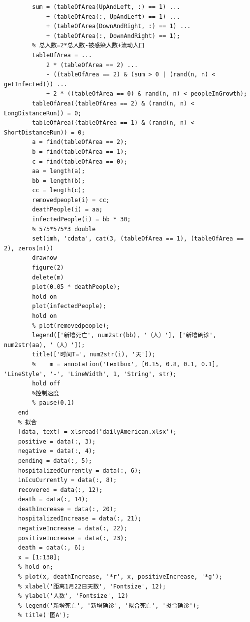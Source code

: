 \documentclass[UTF8]{ctexart}
\begin{document}
\begin{lstlisting}
        sum = (tableOfArea(UpAndLeft, :) == 1) ...
            + (tableOfArea(:, UpAndLeft) == 1) ...
            + (tableOfArea(DownAndRight, :) == 1) ...
            + (tableOfArea(:, DownAndRight) == 1);
        % 总人数=2*总人数-被感染人数+流动人口
        tableOfArea = ...
            2 * (tableOfArea == 2) ...
            - ((tableOfArea == 2) & (sum > 0 | (rand(n, n) < getInfected))) ...
            + 2 * ((tableOfArea == 0) & rand(n, n) < peopleInGrowth);
        tableOfArea((tableOfArea == 2) & (rand(n, n) < LongDistanceRun)) = 0;
        tableOfArea((tableOfArea == 1) & (rand(n, n) < ShortDistanceRun)) = 0;
        a = find(tableOfArea == 2);
        b = find(tableOfArea == 1);
        c = find(tableOfArea == 0);
        aa = length(a);
        bb = length(b);
        cc = length(c);
        removedpeople(i) = cc;
        deathPeople(i) = aa;
        infectedPeople(i) = bb * 30;
        % 575*575*3 double
        set(imh, 'cdata', cat(3, (tableOfArea == 1), (tableOfArea == 2), zeros(n)))
        drawnow
        figure(2)
        delete(m)
        plot(0.05 * deathPeople);
        hold on
        plot(infectedPeople);
        hold on
        % plot(removedpeople);
        legend(['新增死亡', num2str(bb), '（人）'], ['新增确诊', num2str(aa), '（人）']);
        title(['时间T=', num2str(i), '天']);
        %    m = annotation('textbox', [0.15, 0.8, 0.1, 0.1], 'LineStyle', '-', 'LineWidth', 1, 'String', str);
        hold off
        %控制速度
        % pause(0.1)
    end
    % 拟合
    [data, text] = xlsread('dailyAmerican.xlsx');
    positive = data(:, 3);
    negative = data(:, 4);
    pending = data(:, 5);
    hospitalizedCurrently = data(:, 6);
    inIcuCurrently = data(:, 8);
    recovered = data(:, 12);
    death = data(:, 14);
    deathIncrease = data(:, 20);
    hospitalizedIncrease = data(:, 21);
    negativeIncrease = data(:, 22);
    positiveIncrease = data(:, 23);
    death = data(:, 6);
    x = [1:138];
    % hold on;
    % plot(x, deathIncrease, '*r', x, positiveIncrease, '*g');
    % xlabel('距离1月22日天数', 'Fontsize', 12);
    % ylabel('人数', 'Fontsize', 12)
    % legend('新增死亡', '新增确诊', '拟合死亡', '拟合确诊');
    % title('图A');    
\end{lstlisting}
\end{document}
